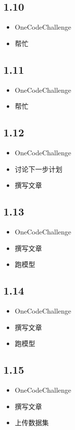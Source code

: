 \documentclass[UTF8]{ctexart}
\begin{document}
\subsection*{1.10}
\begin{itemize}
    \item OneCodeChallenge
    \item 帮忙
\end{itemize}

\subsection*{1.11}
\begin{itemize}
    \item OneCodeChallenge
    \item 帮忙
\end{itemize}

\subsection*{1.12}
\begin{itemize}
    \item OneCodeChallenge
    \item 讨论下一步计划
    \item 撰写文章
\end{itemize}

\subsection*{1.13}
\begin{itemize}
    \item OneCodeChallenge
    \item 撰写文章
    \item 跑模型
\end{itemize}

\subsection*{1.14}
\begin{itemize}
    \item OneCodeChallenge
    \item 撰写文章
    \item 跑模型
\end{itemize}

\subsection*{1.15}
\begin{itemize}
    \item OneCodeChallenge
    \item 撰写文章
    \item 上传数据集
\end{itemize}
\end{document}
